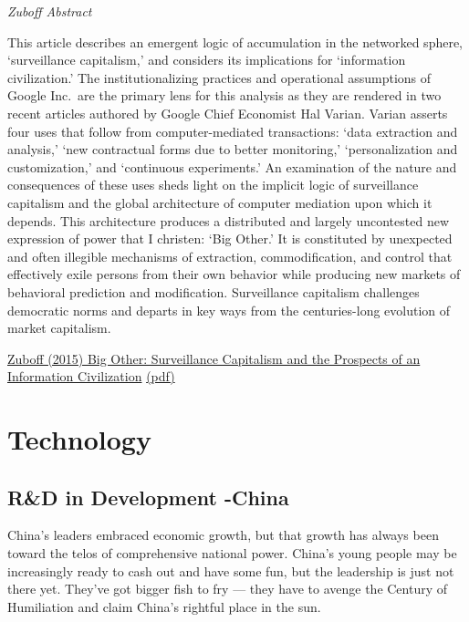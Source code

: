 \documentclass[
]{book}
\begin{document}
\emph{Zuboff Abstract}

This article describes an emergent logic of accumulation in the networked sphere, `surveillance capitalism,' and considers its implications for `information civilization.' The institutionalizing practices and operational assumptions of Google Inc.~are the primary lens for this analysis as they are rendered in two recent articles authored by Google Chief Economist Hal Varian. Varian asserts four uses that follow from computer-mediated transactions: `data extraction and analysis,' `new contractual forms due to better monitoring,' `personalization and customization,' and `continuous experiments.' An examination of the nature and consequences of these uses sheds light on the implicit logic of surveillance capitalism and the global architecture of computer mediation upon which it depends. This architecture produces a distributed and largely uncontested new expression of power that I christen: `Big Other.' It is constituted by unexpected and often illegible mechanisms of extraction, commodification, and control that effectively exile persons from their own behavior while producing new markets of behavioral prediction and modification. Surveillance capitalism challenges democratic norms and departs in key ways from the centuries-long evolution of market capitalism.

\href{https://www.hbs.edu/faculty/Pages/item.aspx?num=49122}{Zuboff (2015) Big Other: Surveillance Capitalism and the Prospects of an Information Civilization}
\href{pdf/Zuboff_2015_Surveillance_Capitalism.pdf}{(pdf)}

\hypertarget{technology}{%
\chapter{Technology}\label{technology}}

\hypertarget{rd-in-development--china}{%
\section{R\&D in Development -China}\label{rd-in-development--china}}

China's leaders embraced economic growth, but that growth has always been toward the telos of comprehensive national power. China's young people may be increasingly ready to cash out and have some fun, but the leadership is just not there yet. They've got bigger fish to fry --- they have to avenge the Century of Humiliation and claim China's rightful place in the sun.
\end{document}
